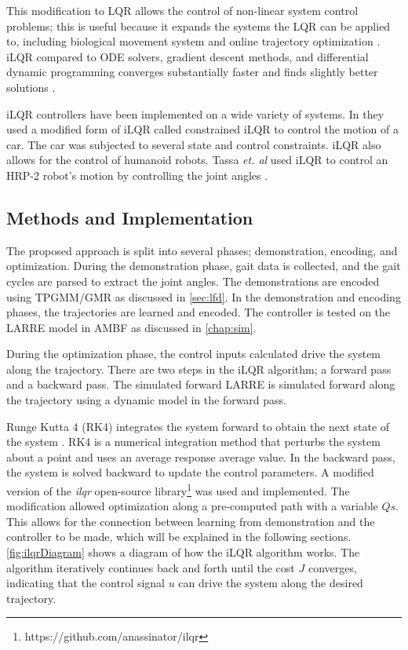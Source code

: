 This modification to LQR allows the control of non-linear system control problems; this is useful because it expands the systems the LQR can be applied to, including biological movement system \cite{iLQR_Li2004} and online trajectory optimization \cite{iLQR_tassa2012}. iLQR compared to ODE solvers, gradient descent methods, and differential dynamic programming converges substantially faster and finds slightly better solutions \cite{iLQR_Li2004}. 

iLQR controllers have been implemented on a wide variety of systems. In \cite{car} they used a modified form of iLQR called constrained iLQR to control the motion of a car. The car was subjected to several state and control constraints. iLQR also allows for the control of humanoid robots. Tassa \textit{et. al} used iLQR to control an HRP-2 robot's motion by controlling the joint angles \cite{iLQR_tassa2014}.

\subsection{Methods and Implementation}
 The proposed approach is split into several phases; demonstration, encoding, and optimization. During the demonstration phase, gait data is collected, and the gait cycles are parsed to extract the joint angles. The demonstrations are encoded using TPGMM/GMR as discussed in \autoref{sec:lfd}. In the demonstration and encoding phases, the trajectories are learned and encoded. The controller is tested on the LARRE model in AMBF as discussed in \autoref{chap:sim}. 

During the optimization phase, the control inputs calculated drive the system along the trajectory. There are two steps in the iLQR algorithm; a forward pass and a backward pass. The simulated forward LARRE is simulated forward along the trajectory using a dynamic model in the forward pass. 

Runge Kutta 4 (RK4) integrates the system forward to obtain the next state of the system \cite{dit2017runge}. RK4 is a numerical integration method that perturbs the system about a point and uses an average response average value.  In the backward pass, the system is solved backward to update the control parameters. A modified version of the \textit{ilqr} open-source library\footnote{https://github.com/anassinator/ilqr} was used and implemented. The modification allowed optimization along a pre-computed path with a variable $Qs$. This allows for the connection between learning from demonstration and the controller to be made, which will be explained in the following sections.  \autoref{fig:ilqrDiagram} shows a diagram of how the iLQR algorithm works. The algorithm iteratively continues back and forth until the cost $J$ converges, indicating that the control signal $u$ can drive the system along the desired trajectory. 

